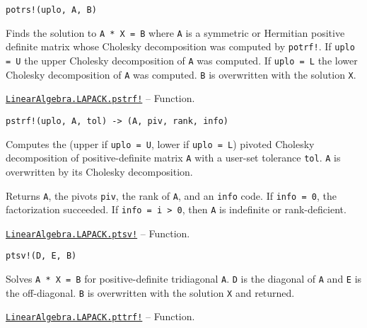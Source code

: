 \begin{adjustwidth}{2em}{0pt}


\begin{verbatim}
potrs!(uplo, A, B)
\end{verbatim}

Finds the solution to \texttt{A * X = B} where \texttt{A} is a symmetric or Hermitian positive definite matrix whose Cholesky decomposition was computed by \texttt{potrf!}. If \texttt{uplo = U} the upper Cholesky decomposition of \texttt{A} was computed. If \texttt{uplo = L} the lower Cholesky decomposition of \texttt{A} was computed. \texttt{B} is overwritten with the solution \texttt{X}.



\end{adjustwidth}
\hypertarget{15908768904043509489}{} 
\hyperlink{15908768904043509489}{\texttt{LinearAlgebra.LAPACK.pstrf!}}  -- {Function.}

\begin{adjustwidth}{2em}{0pt}


\begin{verbatim}
pstrf!(uplo, A, tol) -> (A, piv, rank, info)
\end{verbatim}

Computes the (upper if \texttt{uplo = U}, lower if \texttt{uplo = L}) pivoted Cholesky decomposition of positive-definite matrix \texttt{A} with a user-set tolerance \texttt{tol}. \texttt{A} is overwritten by its Cholesky decomposition.

Returns \texttt{A}, the pivots \texttt{piv}, the rank of \texttt{A}, and an \texttt{info} code. If \texttt{info = 0}, the factorization succeeded. If \texttt{info = i > 0}, then \texttt{A} is indefinite or rank-deficient.



\end{adjustwidth}
\hypertarget{10214325419469953635}{} 
\hyperlink{10214325419469953635}{\texttt{LinearAlgebra.LAPACK.ptsv!}}  -- {Function.}

\begin{adjustwidth}{2em}{0pt}


\begin{verbatim}
ptsv!(D, E, B)
\end{verbatim}

Solves \texttt{A * X = B} for positive-definite tridiagonal \texttt{A}. \texttt{D} is the diagonal of \texttt{A} and \texttt{E} is the off-diagonal. \texttt{B} is overwritten with the solution \texttt{X} and returned.



\end{adjustwidth}
\hypertarget{9537322497705664212}{} 
\hyperlink{9537322497705664212}{\texttt{LinearAlgebra.LAPACK.pttrf!}}  -- {Function.}

